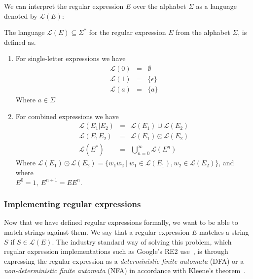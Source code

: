 \documentclass[12pt]{article}
\theoremstyle{definition}
\begin{document}
We can interpret the regular expression $E$ over the alphabet $\Sigma$ as a language denoted by $\mathcal{L}(E)$: \\

\begin{definition} The language $\mathcal{L}(E) \subseteq \Sigma^*$ for the regular expression $E$ from the alphabet $\Sigma$, is defined as.

	\begin{enumerate}
		\item For single-letter expressions we have
			\begin{eqnarray}
				\mathcal{L}(0) &=& \emptyset \\
				\mathcal{L}(1) &=& \{\epsilon\} \\
				\mathcal{L}(a) &=& \{a\}
			\end{eqnarray}
			Where $a \in \Sigma$
			
		\item For combined expressions we have
			\begin{eqnarray}
				\mathcal{L}(E_1|E_2) &=& \mathcal{L}(E_1) \cup \mathcal{L}(E_2) \\
				\mathcal{L}(E_1E_2) &=& \mathcal{L}(E_1) \odot \mathcal{L}(E_2) \\
				\mathcal{L}(E^*) &=& \bigcup^{\infty}_{n = 0}\mathcal{L}(E^n)
			\end{eqnarray}
			Where $\mathcal{L}(E_1) \odot \mathcal{L}(E_2) = \{w_1w_2 \ |\  w_1 \in \mathcal{L}(E_1), w_2 \in \mathcal{L}(E_2)\}$, and where \\
			$E^0 = 1, \ E^{n+1} = EE^n$.
	\end{enumerate}
\end{definition}


\subsubsection{Implementing regular expressions}

Now that we have defined regular expressions formally, we want to be able to match strings against them. We say that a regular expression $E$ matches a string $S$ if $S \in \mathcal{L}(E)$.
The industry standard way of solving this problem, which regular expression implementations such as Google's RE2 use~\cite{matching-in-the-wild}, is through expressing the regular expression as a \textit{deterministic finite automata} (DFA) or a \textit{non-deterministic finite automata} (NFA) in accordance with Kleene's theorem~\cite{kleenes-theorem}. 
\end{document}
